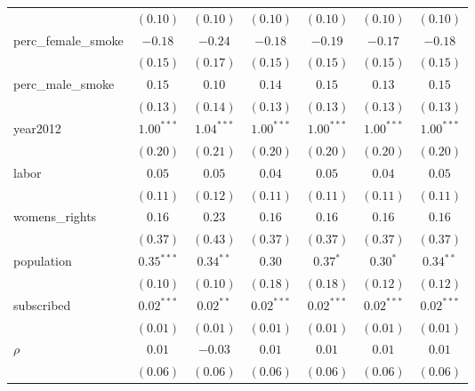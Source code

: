 \begin{table}[!h]
\begin{center}
\begin{tabular}{l c c c c c c }
                        & $(0.10)$     & $(0.10)$     & $(0.10)$     & $(0.10)$     & $(0.10)$     & $(0.10)$     \\
perc\_female\_smoke     & $-0.18$      & $-0.24$      & $-0.18$      & $-0.19$      & $-0.17$      & $-0.18$      \\
                        & $(0.15)$     & $(0.17)$     & $(0.15)$     & $(0.15)$     & $(0.15)$     & $(0.15)$     \\
perc\_male\_smoke       & $0.15$       & $0.10$       & $0.14$       & $0.15$       & $0.13$       & $0.15$       \\
                        & $(0.13)$     & $(0.14)$     & $(0.13)$     & $(0.13)$     & $(0.13)$     & $(0.13)$     \\
year2012                & $1.00^{***}$ & $1.04^{***}$ & $1.00^{***}$ & $1.00^{***}$ & $1.00^{***}$ & $1.00^{***}$ \\
                        & $(0.20)$     & $(0.21)$     & $(0.20)$     & $(0.20)$     & $(0.20)$     & $(0.20)$     \\
labor                   & $0.05$       & $0.05$       & $0.04$       & $0.05$       & $0.04$       & $0.05$       \\
                        & $(0.11)$     & $(0.12)$     & $(0.11)$     & $(0.11)$     & $(0.11)$     & $(0.11)$     \\
womens\_rights          & $0.16$       & $0.23$       & $0.16$       & $0.16$       & $0.16$       & $0.16$       \\
                        & $(0.37)$     & $(0.43)$     & $(0.37)$     & $(0.37)$     & $(0.37)$     & $(0.37)$     \\
population              & $0.35^{***}$ & $0.34^{**}$  & $0.30$       & $0.37^{*}$   & $0.30^{*}$   & $0.34^{**}$  \\
                        & $(0.10)$     & $(0.10)$     & $(0.18)$     & $(0.18)$     & $(0.12)$     & $(0.12)$     \\
subscribed              & $0.02^{***}$ & $0.02^{**}$  & $0.02^{***}$ & $0.02^{***}$ & $0.02^{***}$ & $0.02^{***}$ \\
                        & $(0.01)$     & $(0.01)$     & $(0.01)$     & $(0.01)$     & $(0.01)$     & $(0.01)$     \\
$\rho$                  & $0.01$       & $-0.03$      & $0.01$       & $0.01$       & $0.01$       & $0.01$       \\
                        & $(0.06)$     & $(0.06)$     & $(0.06)$     & $(0.06)$     & $(0.06)$     & $(0.06)$     \\

\end{tabular}
\end{center}
\end{table}
